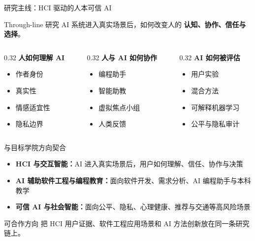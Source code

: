 \documentclass{beamer}
\newcommand{\hl}[1]{\textcolor{maincolor}{\textbf{#1}}}
\newcommand{\tightitems}{\setlength\itemsep{2pt}}
\begin{document}
\begin{frame}{研究主线：HCI 驱动的人本可信 AI}
\begin{block}{Through-line}
研究 AI 系统进入真实场景后，如何改变人的 \hl{认知、协作、信任与选择}。
\end{block}
\vspace{2mm}
\begin{columns}[T]
\begin{column}{0.32\textwidth}
\textbf{人如何理解 AI}
\begin{itemize}\tightitems
  \item 作者身份
  \item 真实性
  \item 情感适宜性
  \item 隐私边界
\end{itemize}
\end{column}
\begin{column}{0.32\textwidth}
\textbf{人与 AI 如何协作}
\begin{itemize}\tightitems
  \item 编程助手
  \item 智能助教
  \item 虚拟焦点小组
  \item 人类反馈
\end{itemize}
\end{column}
\begin{column}{0.32\textwidth}
\textbf{AI 如何被评估}
\begin{itemize}\tightitems
  \item 用户实验
  \item 混合方法
  \item 可解释机器学习
  \item 公平与隐私审计
\end{itemize}
\end{column}
\end{columns}
\end{frame}

\begin{frame}{与目标学院方向契合}
\begin{itemize}\tightitems
  \item \textbf{HCI 与交互智能：}AI 进入真实场景后，用户如何理解、信任、协作与决策
  \item \textbf{AI 辅助软件工程与编程教育：}面向软件开发、需求分析、AI 编程助手与本科教学
  \item \textbf{可信 AI 与社会智能：}面向公平、隐私、心理健康、推荐与交通等高风险场景
\end{itemize}
\vspace{5mm}
\begin{block}{可合作方向}
把 HCI 用户证据、软件工程应用场景和 AI 方法创新放在同一条研究链上。
\end{block}
\end{frame}
\end{document}
